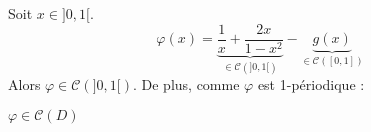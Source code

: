 Soit $x \in ]0, 1[$.
\[
  \varphi(x) = \underbrace{\frac{1}{x} + \frac{2x}{1-x^2}}_{\in\mathcal{C}(]0 ,1[)} - \underbrace{g(x)}_{\in\mathcal{C}([0 ,1])}
\]
Alors $\varphi \in\mathcal{C}(]0, 1[)$. De plus, comme $\varphi$ est 1-périodique :
\begin{result}
  $\varphi \in\mathcal{C}(D)$
\end{result}
